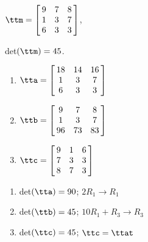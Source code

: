 {$\ttm=\left[\hskip -3pt \begin{array}{ccc} 9&7&8\\  1&3&7
\\  6&3&3\end{array}\hskip -3pt \right] $,

 det$(\ttm)=45$.
\begin{enumerate}
\item $\tta = \left[\hskip -3pt \begin{array}{ccc} 18&14&16\\  1&3&7
\\  6&3&3\end{array}\hskip -3pt \right]$
\item	$\ttb = \left[\hskip -3pt \begin{array}{ccc} 9&7&8\\  1&3&7
\\  96&73&83\end{array}\hskip -3pt \right]$
\item	$\ttc = \left[\hskip -3pt \begin{array}{ccc} 9&1&6\\  7&3&3
\\  8&7&3\end{array}\hskip -3pt \right] $
\end{enumerate}} 
{\begin{enumerate}
\item det$(\tta) = 90$; $2R_1\rightarrow R_1$
\item det$(\ttb) = 45$; $10R_1+R_3\rightarrow R_3$
\item det$(\ttc) = 45$; $\ttc = \ttat$
\end{enumerate}}



  

